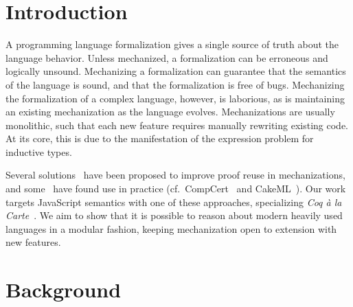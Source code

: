\documentclass[sigplan,nonacm,review]{acmart}
\begin{document}


\maketitle

\section{Introduction}

A programming language formalization gives a single source of truth
about the language behavior.
Unless mechanized,
a formalization can be erroneous and logically unsound.
Mechanizing a formalization can guarantee that
the semantics of the language is sound,
and that
the formalization is free of bugs.
Mechanizing the formalization of a complex language, however,
is laborious,
as is maintaining an existing mechanization as the language evolves. Mechanizations are usually monolithic,
such that each new feature requires manually rewriting existing code.
At its core, this is due to the manifestation of the expression problem for inductive types. 

Several solutions~\cite{jin2023extensible, vistrup2025program, van2022intrinsically, forster2020coq} have been proposed to improve proof reuse in mechanizations, and some~\cite{ebresafe2025certified} have found use in practice (cf.~CompCert~\cite{leroy2016compcert} and CakeML~\cite{kumar2014cakeml}). Our work targets JavaScript semantics with one of these approaches, specializing \emph{Coq à la Carte}~\cite{forster2020coq}. We aim to show that it is possible to reason about modern heavily used languages in a modular fashion, keeping mechanization open to extension with new features. 



\section{Background}
\end{document}
